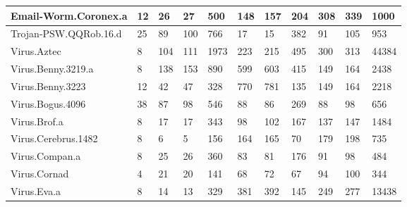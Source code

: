 \begin{small}
\begin{longtable}{|l|l|l|l|l|l|l|l|l|l|l|}
Email-Worm.Coronex.a	&	12	&	26	&	27	&	500	&	148	&	157	&	204	&	308	&	339	&	1000 \\ \hline
Trojan-PSW.QQRob.16.d	&	25	&	89	&	100	&	766	&	17	&	15	&	382	&	91	&	105	&	953	\\ \hline
Virus.Aztec	&	8	&	104	&	111	&	1973	&	223	&	215	&	495	&	300	&	313	&	44384	\\ \hline
Virus.Benny.3219.a	&	8	&	138	&	153	&	890	&	599	&	603	&	415	&	149	&	164	&	2438	\\ \hline
Virus.Benny.3223	&	12	&	42	&	47	&	328	&	770	&	781	&	135	&	149	&	164	&	2218	\\ \hline
Virus.Bogus.4096	&	38	&	87	&	98	&	546	&	88	&	86	&	269	&	88	&	98	&	656	\\ \hline
Virus.Brof.a	&	8	&	17	&	17	&	343	&	98	&	102	&	167	&	137	&	147	&	1484	\\ \hline
Virus.Cerebrus.1482	&	8	&	6	&	5	&	156	&	164	&	165	&	70	&	179	&	198	&	735	\\ \hline
Virus.Compan.a	&	8	&	25	&	26	&	360	&	83	&	81	&	176	&	91	&	98	&	484	\\ \hline
Virus.Cornad	&	4	&	21	&	20	&	141	&	68	&	72	&	67	&	94	&	100	&	344	\\ \hline
Virus.Eva.a	&	8	&	14	&	13	&	329	&	381	&	392	&	145	&	249	&	277	&	13438	\\ \hline

\end{longtable}
\end{small}
